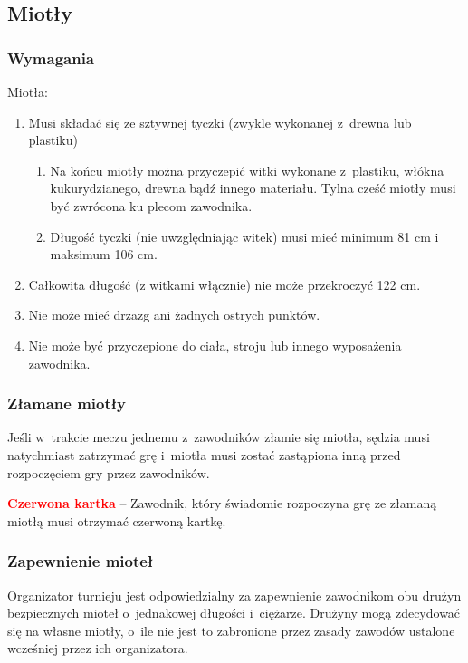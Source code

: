\documentclass[12pt,a4paper]{article}
\newcommand\redcard[1]{\bgroup\textcolor{red}{\textbf{#1}}}
\begin{document}
\subsection{Miotły}

\subsubsection{Wymagania}
Miotła:

\begin{enumerate}
	\item
	      Musi składać się ze sztywnej tyczki (zwykle wykonanej z~drewna lub
	      plastiku)

	      \begin{enumerate}
		      \item
		            Na końcu miotły można przyczepić witki wykonane z~plastiku, włókna
		            kukurydzianego, drewna bądź innego materiału. Tylna cześć miotły
		            musi być zwrócona ku plecom zawodnika.
		      \item
				Długość tyczki (nie uwzględniając witek) musi mieć minimum 81 cm i maksimum 106 cm.
	      \end{enumerate}
	\item
	      Całkowita długość (z witkami włącznie) nie może przekroczyć 122 cm.
	\item
	      Nie może mieć drzazg ani żadnych ostrych punktów.
	\item
	      Nie może być przyczepione do ciała, stroju lub innego wyposażenia
	      zawodnika.
\end{enumerate}

\subsubsection{Złamane miotły}
Jeśli w~trakcie meczu jednemu z~zawodników złamie się miotła, sędzia musi natychmiast zatrzymać grę i~miotła musi zostać zastąpiona inną przed rozpoczęciem gry przez
zawodników.

\redcard{Czerwona kartka} -- Zawodnik, który świadomie rozpoczyna grę ze
złamaną miotłą musi otrzymać czerwoną kartkę.

\subsubsection{Zapewnienie mioteł}
Organizator turnieju jest odpowiedzialny za zapewnienie zawodnikom obu
drużyn bezpiecznych mioteł o~jednakowej długości i~ciężarze. Drużyny
mogą zdecydować się na własne miotły, o~ile nie jest to zabronione 
przez zasady zawodów ustalone wcześniej przez ich organizatora.
\end{document}
